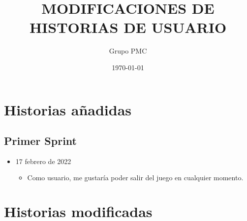 \documentclass{article}
\title{MODIFICACIONES DE HISTORIAS DE USUARIO}
\date{\today}
\author{Grupo PMC}
\begin{document}
\maketitle

\section{Historias añadidas}

\subsection{Primer Sprint}

\begin{itemize}
  \item 17 febrero de 2022
  \begin{itemize}
    \item Como usuario, me gustaría poder salir del juego en cualquier
    momento.
  \end{itemize}
\end{itemize}


\section{Historias modificadas}
\end{document}
